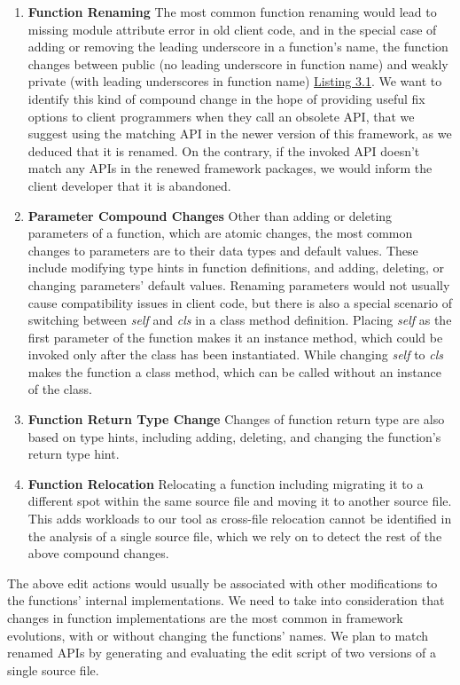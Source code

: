 \begin{enumerate}
  \item \textbf{Function Renaming}
  The most common function renaming would lead to missing module attribute error in old client code, and in the special case of adding or removing the leading underscore in a function's name, the function changes between public (no leading underscore in function name) and weakly private (with leading underscores in function name) \hyperref[fig:access-rename]{Listing 3.1}. We want to identify this kind of compound change in the hope of providing useful fix options to client programmers when they call an obsolete API, that we suggest using the matching API in the newer version of this framework, as we deduced that it is renamed. On the contrary, if the invoked API doesn't match any APIs in the renewed framework packages, we would inform the client developer that it is abandoned.
  \item \textbf{Parameter Compound Changes}
  Other than adding or deleting parameters of a function, which are atomic changes, the most common changes to parameters are to their data types and default values. These include modifying type hints in function definitions, and adding, deleting, or changing parameters' default values. Renaming parameters would not usually cause compatibility issues in client code, but there is also a special scenario of switching between \textit{self} and \textit{cls} in a class method definition. Placing \textit{self} as the first parameter of the function makes it an instance method, which could be invoked only after the class has been instantiated. While changing \textit{self} to \textit{cls} makes the function a class method, which can be called without an instance of the class.
  \item \textbf{Function Return Type Change}
  Changes of function return type are also based on type hints, including adding, deleting, and changing the function's return type hint.
  \item \textbf{Function Relocation}
  Relocating a function including migrating it to a different spot within the same source file and moving it to another source file. This adds workloads to our tool as cross-file relocation cannot be identified in the analysis of a single source file, which we rely on to detect the rest of the above compound changes.
\end{enumerate}

\begin{figure}[!t]
  
  \vspace{-5mm}
\end{figure}

The above edit actions would usually be associated with other modifications to the functions' internal implementations. We need to take into consideration that changes in function implementations are the most common in framework evolutions, with or without changing the functions' names. We plan to match renamed APIs by generating and evaluating the edit script of two versions of a single source file.
